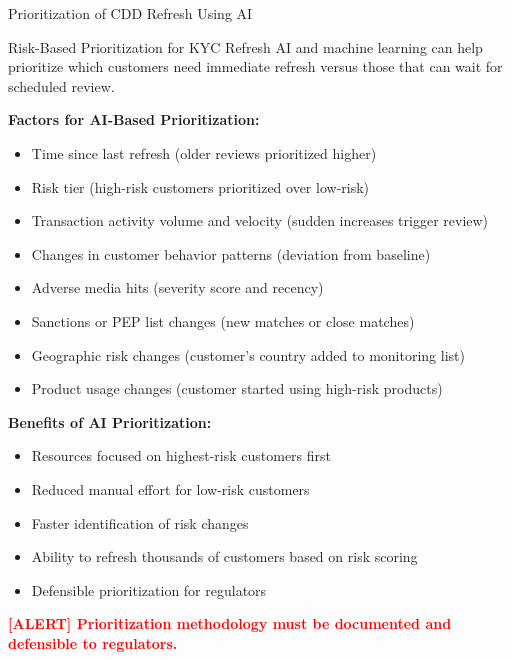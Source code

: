 \documentclass[11pt,a4paper]{beamer}
\newcommand{\redflag}[1]{\textcolor{red}{\textbf{[ALERT] #1}}}
\begin{document}
	\begin{frame}{Prioritization of CDD Refresh Using AI}
		\begin{block}{Risk-Based Prioritization for KYC Refresh}
			AI and machine learning can help prioritize which customers need immediate refresh versus those that can wait for scheduled review.
		\end{block}
		
		\textbf{Factors for AI-Based Prioritization:}
		\begin{itemize}
			\item Time since last refresh (older reviews prioritized higher)
			\item Risk tier (high-risk customers prioritized over low-risk)
			\item Transaction activity volume and velocity (sudden increases trigger review)
			\item Changes in customer behavior patterns (deviation from baseline)
			\item Adverse media hits (severity score and recency)
			\item Sanctions or PEP list changes (new matches or close matches)
			\item Geographic risk changes (customer's country added to monitoring list)
			\item Product usage changes (customer started using high-risk products)
		\end{itemize}
		
		\textbf{Benefits of AI Prioritization:}
		\begin{itemize}
			\item Resources focused on highest-risk customers first
			\item Reduced manual effort for low-risk customers
			\item Faster identification of risk changes
			\item Ability to refresh thousands of customers based on risk scoring
			\item Defensible prioritization for regulators
		\end{itemize}
		
		\redflag{Prioritization methodology must be documented and defensible to regulators.}
	\end{frame}
	
\end{document}
